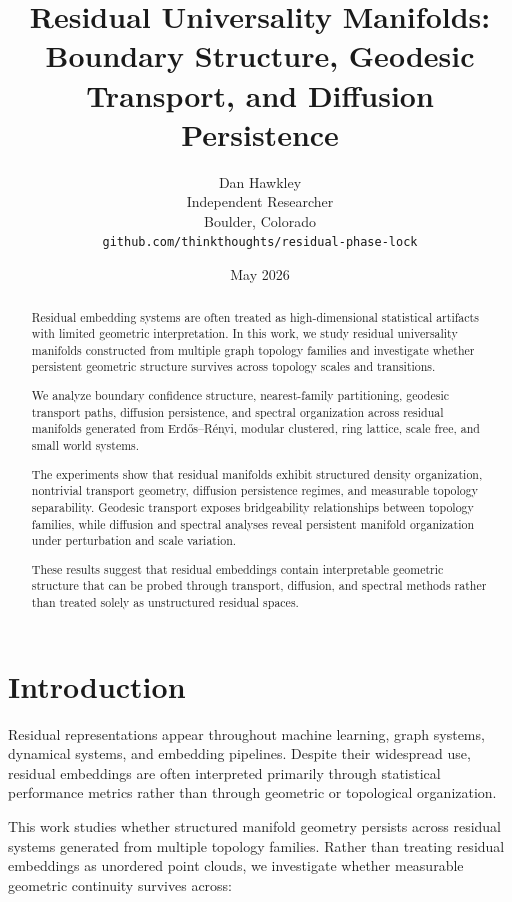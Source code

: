 \documentclass[11pt]{article}
\title{
Residual Universality Manifolds:\\
Boundary Structure, Geodesic Transport, and Diffusion Persistence
}
\author{
Dan Hawkley \\
Independent Researcher \\
Boulder, Colorado \\
\texttt{github.com/thinkthoughts/residual-phase-lock}
}
\date{May 2026}
\begin{document}
\maketitle

\begin{abstract}

Residual embedding systems are often treated as high-dimensional statistical artifacts with limited geometric interpretation. In this work, we study residual universality manifolds constructed from multiple graph topology families and investigate whether persistent geometric structure survives across topology scales and transitions.

We analyze boundary confidence structure, nearest-family partitioning, geodesic transport paths, diffusion persistence, and spectral organization across residual manifolds generated from Erdős--Rényi, modular clustered, ring lattice, scale free, and small world systems.

The experiments show that residual manifolds exhibit structured density organization, nontrivial transport geometry, diffusion persistence regimes, and measurable topology separability. Geodesic transport exposes bridgeability relationships between topology families, while diffusion and spectral analyses reveal persistent manifold organization under perturbation and scale variation.

These results suggest that residual embeddings contain interpretable geometric structure that can be probed through transport, diffusion, and spectral methods rather than treated solely as unstructured residual spaces.

\end{abstract}

\section{Introduction}

Residual representations appear throughout machine learning, graph systems, dynamical systems, and embedding pipelines. Despite their widespread use, residual embeddings are often interpreted primarily through statistical performance metrics rather than through geometric or topological organization.

This work studies whether structured manifold geometry persists across residual systems generated from multiple topology families. Rather than treating residual embeddings as unordered point clouds, we investigate whether measurable geometric continuity survives across:
\end{document}
